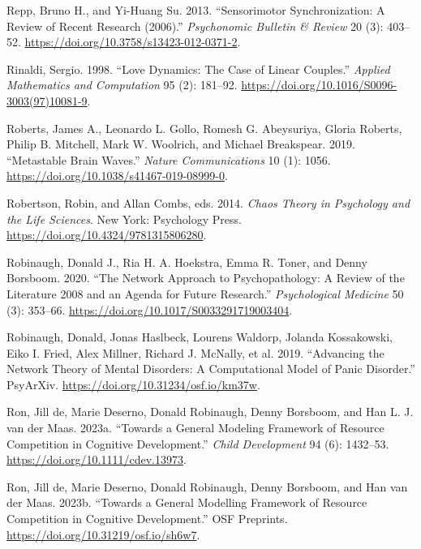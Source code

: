 \documentclass[
  a4paper,
  DIV=11,
  numbers=noendperiod,
  oneside]{scrreprt}
\newlength{\cslhangindent}
\newlength{\cslentryspacingunit} %
\newenvironment{CSLReferences}[2] %
 {%
  \setlength{\parindent}{0pt}
  \ifodd #1
  \let\oldpar\par
  \def\par{\hangindent=\cslhangindent\oldpar}
  \fi
  \setlength{\parskip}{#2\cslentryspacingunit}
 }%
 {}
\begin{document}
\begin{CSLReferences}{1}{0}
\leavevmode{}%
Repp, Bruno H., and Yi-Huang Su. 2013. {``Sensorimotor Synchronization:
{A} Review of Recent Research (2006).''}
\emph{Psychonomic Bulletin \& Review} 20 (3): 403--52.
\url{https://doi.org/10.3758/s13423-012-0371-2}.

\leavevmode{}%
Rinaldi, Sergio. 1998. {``Love Dynamics: {The} Case of Linear
Couples.''} \emph{Applied Mathematics and Computation} 95 (2): 181--92.
\url{https://doi.org/10.1016/S0096-3003(97)10081-9}.

\leavevmode{}%
Roberts, James A., Leonardo L. Gollo, Romesh G. Abeysuriya, Gloria
Roberts, Philip B. Mitchell, Mark W. Woolrich, and Michael Breakspear.
2019. {``Metastable Brain Waves.''} \emph{Nature Communications} 10 (1):
1056. \url{https://doi.org/10.1038/s41467-019-08999-0}.

\leavevmode{}%
Robertson, Robin, and Allan Combs, eds. 2014. \emph{Chaos Theory in
{Psychology} and the {Life Sciences}}. {New York}: {Psychology Press}.
\url{https://doi.org/10.4324/9781315806280}.

\leavevmode{}%
Robinaugh, Donald J., Ria H. A. Hoekstra, Emma R. Toner, and Denny
Borsboom. 2020. {``The Network Approach to Psychopathology: A Review of
the Literature 2008 and an Agenda for Future
Research.''} \emph{Psychological Medicine} 50 (3): 353--66.
\url{https://doi.org/10.1017/S0033291719003404}.

\leavevmode{}%
Robinaugh, Donald, Jonas Haslbeck, Lourens Waldorp, Jolanda Kossakowski,
Eiko I. Fried, Alex Millner, Richard J. McNally, et al. 2019.
{``Advancing the {Network Theory} of {Mental Disorders}: {A
Computational Model} of {Panic Disorder}.''} {PsyArXiv}.
\url{https://doi.org/10.31234/osf.io/km37w}.

\leavevmode{}%
Ron, Jill de, Marie Deserno, Donald Robinaugh, Denny Borsboom, and Han
L. J. van der Maas. 2023a. {``Towards a General Modeling Framework of
Resource Competition in Cognitive Development.''} \emph{Child
Development} 94 (6): 1432--53. \url{https://doi.org/10.1111/cdev.13973}.

\leavevmode{}%
Ron, Jill de, Marie Deserno, Donald Robinaugh, Denny Borsboom, and Han
van der Maas. 2023b. {``Towards a {General Modelling Framework} of
{Resource Competition} in {Cognitive Development}.''} {OSF Preprints}.
\url{https://doi.org/10.31219/osf.io/sh6w7}.


\end{CSLReferences}
\end{document}
